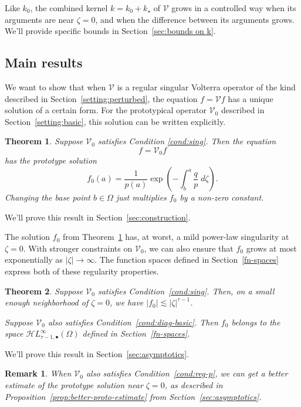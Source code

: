 \documentclass{article}
\theoremstyle{plain}
\newtheorem{thm}{Theorem}
\newtheorem{rmk}{Remark}
\newcommand{\singexp}[2]{\mathcal{H}L^\infty_{#1, #2}}
\newcommand{\singexpalg}[1]{\singexp{#1}{\bullet}}
\newcommand{\volterra}{\mathcal{V}}
\newcommand{\hardpart}{\mathcal{V}_0}
\newcommand{\hardker}{k_0}
\newcommand{\softker}{k_\star}
\newcommand{\solproto}{f_0}
\newcommand{\domain}{\Omega}
\begin{document}
Like $\hardker$, the combined kernel $k = \hardker + \softker$ of $\volterra$ grows in a controlled way when its arguments are near $\zeta = 0$, and when the difference between its arguments grows. We'll provide specific bounds in Section~\ref{sec:bounds on k}. 

\subsection{Main results}\label{sec:results}
We want to show that when $\volterra$ is a regular singular Volterra operator of the kind described in Section~\ref{setting:perturbed}, the equation $f = \volterra f$ has a unique solution of a certain form. For the prototypical operator $\hardpart$ described in Section~\ref{setting:basic}, this solution can be written explicitly.
\begin{thm}\label{thm:basic_volterra}
Suppose $\hardpart$ satisfies {\em Condition \eqref{cond:sing}}. Then the equation
\[ f = \hardpart f \]
has the {\em prototype solution}
\begin{equation}\label{eqn:test_solution}
\solproto(a) = \frac{1}{p(a)} \exp\left(-\int_{b}^{a}\frac{q}{p}\;d\zeta\right).
\end{equation}
Changing the base point $b \in \domain$ just multiplies $f_0$ by a non-zero constant.
\end{thm}
We'll prove this result in Section~\ref{sec:construction}.

The solution $\solproto$ from Theorem~\ref{thm:basic_volterra} has, at worst, a mild power-law singularity at $\zeta = 0$. With stronger constraints on $\hardpart$, we can also ensure that $\solproto$ grows at most exponentially as $|\zeta| \to \infty$. The function spaces defined in Section~\ref{fn-spaces} express both of these regularity properties.
\begin{thm}\label{thm:proto-growth}
Suppose $\hardpart$ satisfies {\em Condition~\eqref{cond:sing}}. Then, on a small enough neighborhood of $\zeta = 0$, we have $|\solproto| \lesssim |\zeta|^{\tau-1}$.

Suppose $\hardpart$ also satisfies {\em Condition~\eqref{cond:diag-basic}}. Then $f_0$ belongs to the space $\singexpalg{\tau-1}(\domain)$ defined in Section~\ref{fn-spaces}.
\end{thm}
We'll prove this result in Section~\ref{sec:asymptotics}.
\begin{rmk}
When $\hardpart$ also satisfies Condition~\eqref{cond:reg-p}, we can get a better estimate of the prototype solution near $\zeta = 0$, as described in Proposition~\ref{prop:better-proto-estimate} from Section~\ref{sec:asymptotics}.
\end{rmk}
\end{document}
